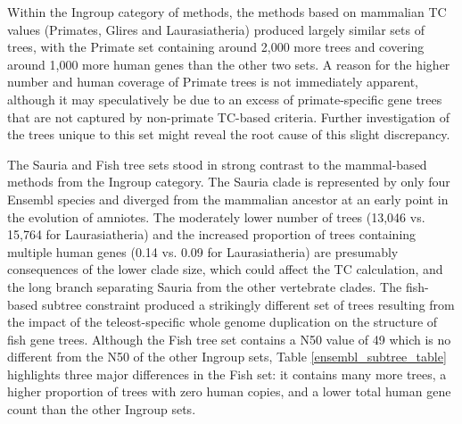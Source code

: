 Within the Ingroup category of methods, the methods based on
mammalian TC values (Primates, Glires and Laurasiatheria) produced
largely similar sets of trees, with the Primate set containing around
2,000 more trees and covering around 1,000 more human genes than the
other two sets. A reason for the higher number and human coverage of
Primate trees is not immediately apparent, although it may
speculatively be due to an excess of primate-specific gene trees that
are not captured by non-primate TC-based criteria. Further
investigation of the trees unique to this set might reveal the root
cause of this slight discrepancy.

The Sauria and Fish tree sets stood in strong contrast to the
mammal-based methods from the Ingroup category. The Sauria clade is
represented by only four Ensembl species and diverged from the
mammalian ancestor at an early point in the evolution of amniotes. The
moderately lower number of trees (13,046 vs. 15,764 for
Laurasiatheria) and the increased proportion of trees containing
multiple human genes (0.14 vs. 0.09 for Laurasiatheria) are presumably
consequences of the lower clade size, which could affect the TC
calculation, and the long branch separating Sauria from the other
vertebrate clades. The fish-based subtree constraint produced a
strikingly different set of trees resulting from the impact of the
teleost-specific whole genome duplication on the structure of fish
gene trees. Although the Fish tree set contains a N50 value of 49
which is no different from the N50 of the other Ingroup sets, Table
\ref{ensembl_subtree_table} highlights three major differences in the
Fish set: it contains many more trees, a higher proportion of trees
with zero human copies, and a lower total human gene count than the
other Ingroup sets.

